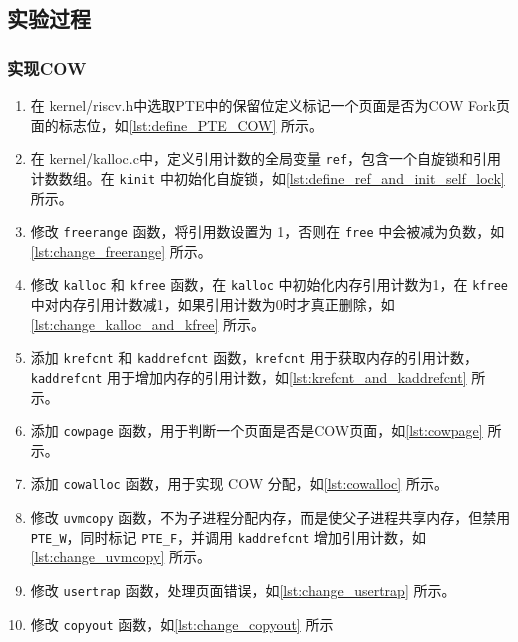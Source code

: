 \subsection{实验过程}

\subsubsection{实现COW}

\begin{enumerate}
	\item 在 kernel/riscv.h中选取PTE中的保留位定义标记一个页面是否为COW Fork页面的标志位，如\cref{lst:define_PTE_COW} 所示。
	
	\item 在 kernel/kalloc.c中，定义引用计数的全局变量 \texttt{ref}，包含一个自旋锁和引用计数数组。在 \texttt{kinit} 中初始化自旋锁，如\cref{lst:define_ref_and_init_self_lock} 所示。
	
	\item 修改 \texttt{freerange} 函数，将引用数设置为 1，否则在 \texttt{free} 中会被减为负数，如\cref{lst:change_freerange} 所示。
	
	\item 修改 \texttt{kalloc} 和 \texttt{kfree} 函数，在 \texttt{kalloc} 中初始化内存引用计数为1，在 \texttt{kfree} 中对内存引用计数减1，如果引用计数为0时才真正删除，如\cref{lst:change_kalloc_and_kfree} 所示。
	
	\item 添加 \texttt{krefcnt} 和 \texttt{kaddrefcnt} 函数，\texttt{krefcnt} 用于获取内存的引用计数，\texttt{kaddrefcnt} 用于增加内存的引用计数，如\cref{lst:krefcnt_and_kaddrefcnt} 所示。
	 
	\item 添加 \texttt{cowpage} 函数，用于判断一个页面是否是COW页面，如\cref{lst:cowpage} 所示。
	
	\item 添加 \texttt{cowalloc} 函数，用于实现 COW 分配，如\cref{lst:cowalloc} 所示。
	
	\item 修改 \texttt{uvmcopy} 函数，不为子进程分配内存，而是使父子进程共享内存，但禁用 \texttt{PTE\_W}，同时标记 \texttt{PTE\_F}，并调用 
	\texttt{kaddrefcnt} 增加引用计数，如\cref{lst:change_uvmcopy} 所示。
	
	\item 修改 \texttt{usertrap} 函数，处理页面错误，如\cref{lst:change_usertrap} 所示。
	
	\item 修改 \texttt{copyout} 函数，如\cref{lst:change_copyout} 所示
\end{enumerate}


